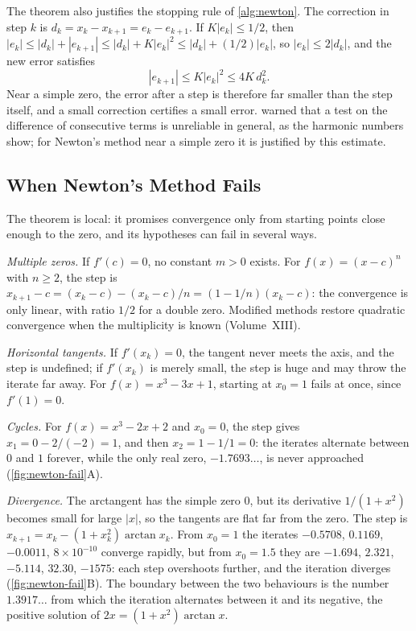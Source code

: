 The theorem also justifies the stopping rule of \cref{alg:newton}. The correction in step $k$ is $d_k=x_k-x_{k+1}=e_k-e_{k+1}$. If $K|e_k|\le1/2$, then $|e_k|\le|d_k|+|e_{k+1}|\le|d_k|+K|e_k|^2\le|d_k|+(1/2)|e_k|$, so $|e_k|\le2|d_k|$, and the new error satisfies
\[
|e_{k+1}|\le K|e_k|^2\le4K\,d_k^2 .
\]
Near a simple zero, the error after a step is therefore far smaller than the step itself, and a small correction certifies a small error.  warned that a test on the difference of consecutive terms is unreliable in general, as the harmonic numbers show; for Newton's method near a simple zero it is justified by this estimate.

\subsection{When Newton's Method Fails}

The theorem is local: it promises convergence only from starting points close enough to the zero, and its hypotheses can fail in several ways.

\emph{Multiple zeros.} If $f'(c)=0$, no constant $m>0$ exists. For $f(x)=(x-c)^n$ with $n\ge2$, the step is $x_{k+1}-c=(x_k-c)-(x_k-c)/n=(1-1/n)(x_k-c)$: the convergence is only linear, with ratio $1/2$ for a double zero. Modified methods restore quadratic convergence when the multiplicity is known (Volume~XIII).

\emph{Horizontal tangents.} If $f'(x_k)=0$, the tangent never meets the axis, and the step is undefined; if $f'(x_k)$ is merely small, the step is huge and may throw the iterate far away. For $f(x)=x^3-3x+1$, starting at $x_0=1$ fails at once, since $f'(1)=0$.

\emph{Cycles.} For $f(x)=x^3-2x+2$ and $x_0=0$, the step gives $x_1=0-2/(-2)=1$, and then $x_2=1-1/1=0$: the iterates alternate between $0$ and $1$ forever, while the only real zero, $-1.7693\ldots$, is never approached (\cref{fig:newton-fail}A).

\emph{Divergence.} The arctangent has the simple zero $0$, but its derivative $1/(1+x^2)$ becomes small for large $|x|$, so the tangents are flat far from the zero. The step is $x_{k+1}=x_k-(1+x_k^2)\arctan x_k$. From $x_0=1$ the iterates $-0.5708$, $0.1169$, $-0.0011$, $8\times10^{-10}$ converge rapidly, but from $x_0=1.5$ they are $-1.694$, $2.321$, $-5.114$, $32.30$, $-1575$: each step overshoots further, and the iteration diverges (\cref{fig:newton-fail}B). The boundary between the two behaviours is the number $1.3917\ldots$ from which the iteration alternates between it and its negative, the positive solution of $2x=(1+x^2)\arctan x$.

